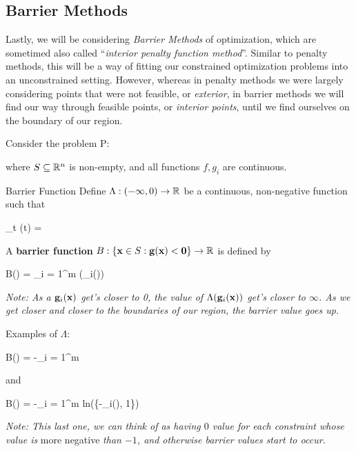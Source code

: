 \subsection{Barrier Methods}

Lastly, we will be considering \textit{Barrier Methods} of optimization,
which are sometimed also called ``\textit{interior penalty function method}''.
Similar to penalty methods, this will be a way of fitting our constrained
optimization problems into an unconstrained setting.
However, whereas in penalty methods we were largely considering points that were not
feasible, or \textit{exterior}, in barrier methods we will find our way through
feasible points, or \textit{interior points}, until we find ourselves on the
boundary of our region.

Consider the problem P:
where $S \subseteq \mathbb{R}^n$ is non-empty, and all functions $f, g_i$ are
continuous.


\begin{defn}{Barrier Function}{}
	Define $\Lambda: (-\infty, 0) \rightarrow \mathbb{R}$ be a continuous, non-negative
	function such that 
	\begin{frml}
		\lim_{t } \Lambda (t) = \infty
	\end{frml}
	A \textbf{barrier function}
		$B: \{ \mathbf{x} \in S : \mathbf{g}(\mathbf{x}) < \mathbf{0} \} \rightarrow \mathbb{R}$
	is defined by
	\begin{frml}
		B(\vx) = \sum_{i = 1}^m \Lambda(\vg_i(\vx))
	\end{frml}
\end{defn}

\textit{Note: As a $\mathbf{g}_i(\mathbf{x})$ get's closer to 0, the value of $\Lambda(\mathbf{g}_i(\mathbf{x}))$
get's closer to $\infty$. As we get closer and closer to the boundaries of our
region, the barrier value goes up.}

Examples of $\Lambda$:
\begin{frml}
	B(\vx) = -\sum_{i = 1}^m \frac{1}{\vg(\vx)}
\end{frml}
and 
\begin{frml}
	B(\vx) = -\sum_{i = 1}^m ln(\min\{-\vg_i(\vx), 1\})
\end{frml}
\textit{Note: This last one, we can think of as having $0$ value for each constraint
whose value is} more negative \textit{than $-1$, and otherwise barrier values
start to occur.}


